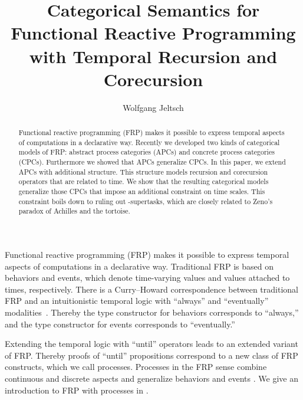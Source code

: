 \documentclass[copyright,creativecommons]{eptcs}
\title{Categorical Semantics for Functional Reactive Programming\\
       with Temporal Recursion and Corecursion}
\author{Wolfgang Jeltsch
        \institute{TTÜ Küberneetika Instituut\\Tallinn, Estonia}
        \email{wolfgang@cs.ioc.ee}}
\begin{document}
\maketitle

\begin{abstract}

Functional reactive programming (FRP) makes it possible to express temporal
aspects of computations in a declarative way. Recently we developed two kinds of
categorical models of FRP: abstract process categories (APCs) and concrete
process categories (CPCs). Furthermore we showed that APCs generalize CPCs. In
this paper, we extend APCs with additional structure. This structure models
recursion and corecursion operators that are related to time. We show that the
resulting categorical models generalize those CPCs that impose an additional
constraint on time scales. This constraint boils down to ruling out
-supertasks, which are closely related to Zeno’s paradox of Achilles and the
tortoise.

\end{abstract}




Functional reactive programming (FRP) makes it possible to express temporal
aspects of computations in a declarative way. Traditional FRP is based on
behaviors and events, which denote time-varying values and values attached to
times, respectively. There is a Curry–Howard correspondence between traditional
FRP and an intuitionistic temporal logic with “always” and “eventually”
modalities~\cite{jeltsch:entcs-286,jeffrey:plpv-2012}. Thereby the type
constructor for behaviors corresponds to “always,” and the type constructor for
events corresponds to “eventually.”

Extending the temporal logic with “until” operators leads to an extended variant
of FRP. Thereby proofs of “until” propositions correspond to a new class of FRP
constructs, which we call processes. Processes in the FRP sense combine
continuous and discrete aspects and generalize behaviors and events
\cite[Section~2]{jeltsch:plpv-2013}. We give an introduction to FRP with
processes in .
\end{document}
